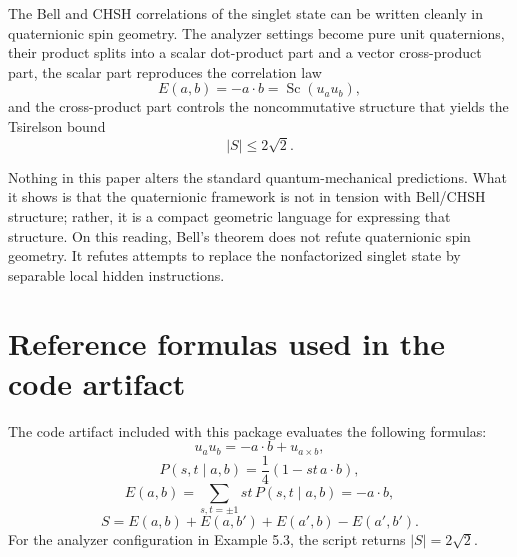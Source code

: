 \documentclass[11pt]{article}
\theoremstyle{remark}
\newcommand{\Sc}{\operatorname{Sc}}
\newcommand{\abs}[1]{\left\lvert #1 \right\rvert}
\begin{document}
The Bell and CHSH correlations of the singlet state can be written cleanly in quaternionic spin geometry. The analyzer settings become pure unit quaternions, their product splits into a scalar dot-product part and a vector cross-product part, the scalar part reproduces the correlation law
\[
E(a,b) = -a\cdot b = \Sc(u_a u_b),
\]
and the cross-product part controls the noncommutative structure that yields the Tsirelson bound
\[
\abs{S}\le 2\sqrt2.
\]

Nothing in this paper alters the standard quantum-mechanical predictions. What it shows is that the quaternionic framework is not in tension with Bell/CHSH structure; rather, it is a compact geometric language for expressing that structure. On this reading, Bell's theorem does not refute quaternionic spin geometry. It refutes attempts to replace the nonfactorized singlet state by separable local hidden instructions.

\appendix

\section{Reference formulas used in the code artifact}

The code artifact included with this package evaluates the following formulas:
\[
u_a u_b = -a\cdot b + u_{a\times b},
\]
\[
P(s,t\mid a,b)=\frac14(1-st\,a\cdot b),
\]
\[
E(a,b)=\sum_{s,t=\pm1} st\,P(s,t\mid a,b)=-a\cdot b,
\]
\[
S = E(a,b)+E(a,b')+E(a',b)-E(a',b').
\]
For the analyzer configuration in Example 5.3, the script returns $\abs{S}=2\sqrt2$.



\end{document}
